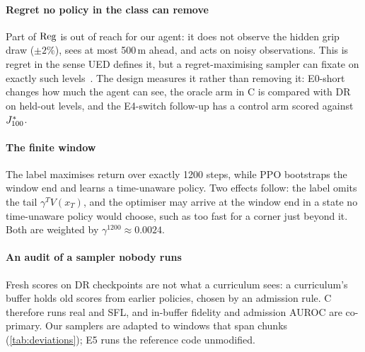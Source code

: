 \paragraph{Regret no policy in the class can remove} Part of $\mathrm{Reg}$ is out of reach for
our agent: it does not observe the hidden grip draw ($\pm2\%$), sees at most 500\,m ahead,
and acts on noisy observations. This is regret in the sense UED defines it, but a
regret-maximising sampler can fixate on exactly such levels~\citep{beukman2024remidi}. The
design measures it rather than removing it: E0-short changes how much the agent can see,
the oracle arm in C is compared with DR on held-out levels, and the E4-switch follow-up
has a control arm scored against $J^{*}_{100}$.

\paragraph{The finite window} The label maximises return over exactly \num{1200} steps,
while PPO bootstraps the window end and learns a time-unaware policy. Two effects follow:
the label omits the tail $\gamma^{T}V(x_T)$, and the optimiser may arrive at the window
end in a state no time-unaware policy would choose, such as too fast for a corner just
beyond it. Both are weighted by $\gamma^{1200} \approx 0.0024$.

\paragraph{An audit of a sampler nobody runs} Fresh scores on DR checkpoints are not what a
curriculum sees: a curriculum's buffer holds old scores from earlier policies, chosen by
an admission rule. C therefore runs real \PLRp{} and SFL, and in-buffer fidelity and
admission AUROC are co-primary. Our samplers are adapted to windows that span chunks
(\cref{tab:deviations}); E5 runs the reference code unmodified.

